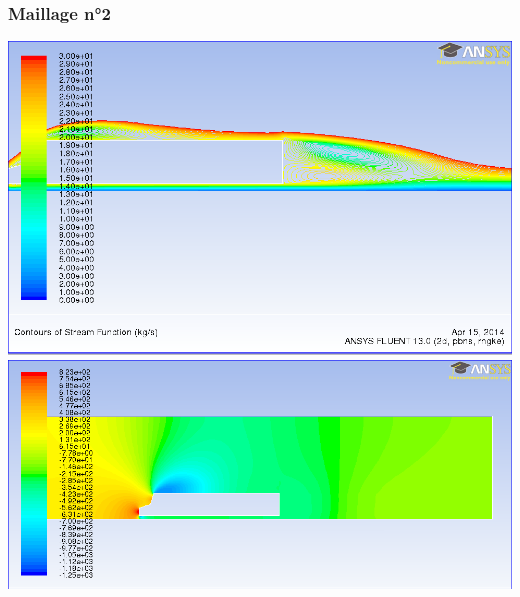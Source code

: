 \documentclass[handout]{beamer}
\begin{document}
\begin{frame}
	\frametitle{Maillage n°2}
	\begin{center}
	\includegraphics[scale=0.2]{../resultsCx/remorque1_110_stream.png}\\
	\includegraphics[scale=0.2]{../resultsCx/remorque1_110_pression.png}
	\end{center}
\end{frame}
\end{document}
